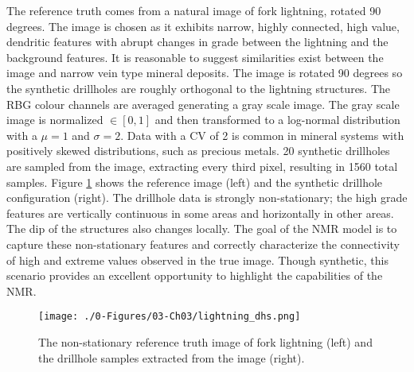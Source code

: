 The reference truth comes from a natural image of fork lightning, rotated 90 degrees. The image is chosen as it exhibits narrow, highly connected, high value, dendritic features with abrupt changes in grade between the lightning and the background features. It is reasonable to suggest similarities exist between the image and narrow vein type mineral deposits. The image is rotated 90 degrees so the synthetic drillholes are roughly orthogonal to the lightning structures. The \gls{RBG} colour channels are averaged generating a gray scale image. The gray scale image is normalized $\in [0, 1]$ and then transformed to a log-normal distribution with a $\mu = 1$ and $\sigma = 2$. Data with a \gls{CV} of 2 is common in mineral systems with positively skewed distributions, such as precious metals. 20 synthetic drillholes are sampled from the image, extracting every third pixel, resulting in 1560 total samples. Figure \ref{fig:lightning_dhs} shows the reference image (left) and the synthetic drillhole configuration (right). The drillhole data is strongly non-stationary; the high grade features are vertically continuous in some areas and horizontally in other areas. The dip of the structures also changes locally. The goal of the \gls{NMR} model is to capture these non-stationary features and correctly characterize the connectivity of high and extreme values observed in the true image. Though synthetic, this scenario provides an excellent opportunity to highlight the capabilities of the \gls{NMR}.

\begin{figure}[htb!]
    \centering
    \texttt{[image: ./0-Figures/03-Ch03/lightning\_dhs.png]}
    \caption{The non-stationary reference truth image of fork lightning (left) and the drillhole samples extracted from the image (right). }
    \label{fig:lightning_dhs}
\end{figure}

